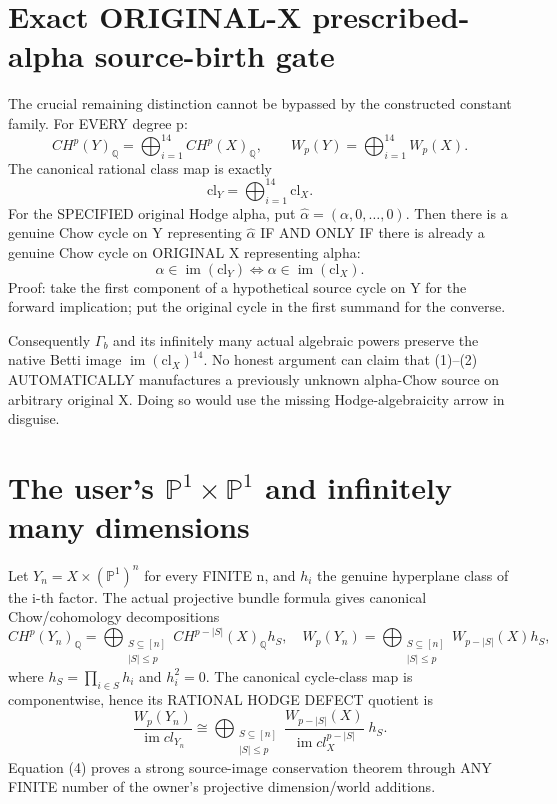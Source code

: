 \documentclass[11pt]{article}
\begin{document}
\section{Exact ORIGINAL-X prescribed-alpha source-birth gate}
The crucial remaining distinction cannot
be bypassed by the constructed constant family.
For EVERY degree p:
\[
CH^p(Y)_{\mathbb Q}
=\bigoplus_{i=1}^{14}CH^p(X)_{\mathbb Q},
\qquad
W_p(Y)=\bigoplus_{i=1}^{14}W_p(X).
\]
The canonical rational class map is exactly
\[
\mathrm{cl}_Y=\bigoplus_{i=1}^{14}
\mathrm{cl}_X.
\]
For the SPECIFIED original Hodge alpha,
put \(\widehat\alpha=(\alpha,0,\ldots,0)\).
Then there is a genuine Chow cycle on
Y representing \(\widehat\alpha\)
IF AND ONLY IF there is already a genuine
Chow cycle on ORIGINAL X representing alpha:
\[
\boxed{
\widehat\alpha\in\operatorname{im}(\mathrm{cl}_Y)
\iff
\alpha\in\operatorname{im}(\mathrm{cl}_X).
}\tag{3}
\]
Proof: take the first component of a
hypothetical source cycle on Y for the
forward implication; put the original
cycle in the first summand for the converse.

Consequently \(\Gamma_b\) and its infinitely
many actual algebraic powers preserve
the native Betti image
\(\operatorname{im}(\mathrm{cl}_X)^{14}\).
No honest argument can claim that
(1)--(2) AUTOMATICALLY manufactures
a previously unknown alpha-Chow source
on arbitrary original X. Doing so
would use the missing Hodge-algebraicity
arrow in disguise.

\section{The user's \(\mathbb P^1\times\mathbb P^1\) and infinitely many dimensions}
Let \(Y_n=X\times(\mathbb P^1)^n\) for
every FINITE n, and \(h_i\) the genuine
hyperplane class of the i-th factor.
The actual projective bundle formula
gives canonical Chow/cohomology
decompositions
\[
CH^p(Y_n)_{\mathbb Q}
=\bigoplus_{\substack{S\subseteq[n]\\|S|\le p}}
CH^{p-|S|}(X)_{\mathbb Q}h_S,
\quad
W_p(Y_n)=
\bigoplus_{\substack{S\subseteq[n]\\|S|\le p}}
W_{p-|S|}(X)h_S,
\]
where \(h_S=\prod_{i\in S}h_i\) and
\(h_i^2=0\).
The canonical cycle-class map is componentwise,
hence its RATIONAL HODGE DEFECT quotient is
\[
\boxed{
\frac{W_p(Y_n)}{\operatorname{im}cl_{Y_n}}
\cong
\bigoplus_{\substack{S\subseteq[n]\\|S|\le p}}
\frac{W_{p-|S|}(X)}
     {\operatorname{im}cl_X^{p-|S|}}\;h_S.
}\tag{4}
\]
Equation (4) proves a strong source-image
conservation theorem through ANY FINITE
number of the owner's projective
dimension/world additions.
\end{document}
